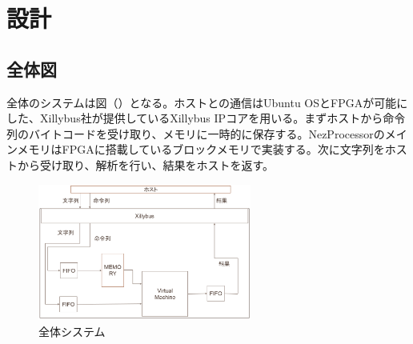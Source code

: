 \documentclass[paper]{ieicej}
\begin{document}




\section{設計}

\subsection{全体図}

全体のシステムは図（）となる。ホストとの通信はUbuntu OSとFPGAが可能にした、Xillybus社が提供しているXillybus IPコアを用いる。まずホストから命令列のバイトコードを受け取り、メモリに一時的に保存する。NezProcessorのメインメモリはFPGAに搭載しているブロックメモリで実装する。次に文字列をホストから受け取り、解析を行い、結果をホストを返す。

\begin{figure}[h]
    \begin{center}
        \includegraphics[width=70mm]{./fig/system}
      \caption{全体システム}
    \end{center}
\end{figure}
\end{document}
